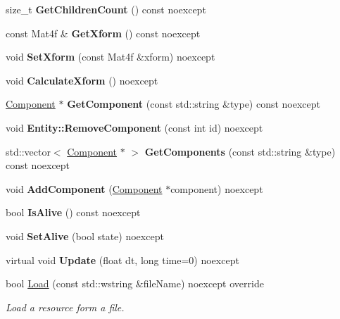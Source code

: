 \begin{DoxyCompactItemize}
size\+\_\+t {\bfseries Get\+Children\+Count} () const noexcept
\item 
\mbox{\label{class_blade_1_1_entity_a3d3aeafc92f2e8f8b510a94ad01f6361}} 
const Mat4f \& {\bfseries Get\+Xform} () const noexcept
\item 
\mbox{\label{class_blade_1_1_entity_ad69a2e7b6f43cf2965150c17eb1df15d}} 
void {\bfseries Set\+Xform} (const Mat4f \&xform) noexcept
\item 
\mbox{\label{class_blade_1_1_entity_ad6476f0fea2763050744f606bae27a57}} 
void {\bfseries Calculate\+Xform} () noexcept
\item 
\mbox{\label{class_blade_1_1_entity_a8b13a51096740b31ae205eb2877afc15}} 
\hyperlink{class_blade_1_1_component}{Component} $\ast$ {\bfseries Get\+Component} (const std\+::string \&type) const noexcept
\item 
\mbox{\label{class_blade_1_1_entity_aa5a6d79575c25056f8e809277d456a3c}} 
void {\bfseries Entity\+::\+Remove\+Component} (const int id) noexcept
\item 
\mbox{\label{class_blade_1_1_entity_a03a193877e136ceb85909a3bc0944968}} 
std\+::vector$<$ \hyperlink{class_blade_1_1_component}{Component} $\ast$ $>$ {\bfseries Get\+Components} (const std\+::string \&type) const noexcept
\item 
\mbox{\label{class_blade_1_1_entity_acf8c99d68959692c47696a1b0a4a3454}} 
void {\bfseries Add\+Component} (\hyperlink{class_blade_1_1_component}{Component} $\ast$component) noexcept
\item 
\mbox{\label{class_blade_1_1_entity_a97c777c4554eb238b566615b7116ee92}} 
bool {\bfseries Is\+Alive} () const noexcept
\item 
\mbox{\label{class_blade_1_1_entity_a215a8ed4c4fb90a6aa2dc6cf7ca28a1a}} 
void {\bfseries Set\+Alive} (bool state) noexcept
\item 
\mbox{\label{class_blade_1_1_entity_a472f9a9c9c2cd4e963b28fe9f7e7b9f4}} 
virtual void {\bfseries Update} (float dt, long time=0) noexcept
\item 
bool \hyperlink{class_blade_1_1_entity_a1e23e9402a5c5a1d266c208c7637c539}{Load} (const std\+::wstring \&file\+Name) noexcept override
\begin{DoxyCompactList}\small\item\em Load a resource form a file. \end{DoxyCompactList}\end{DoxyCompactItemize}


